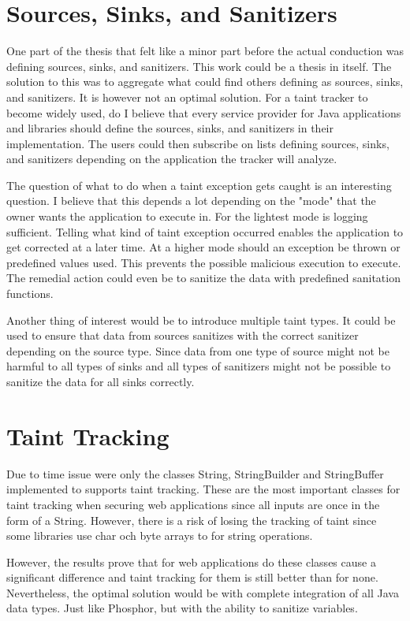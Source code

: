 \section{Sources, Sinks, and Sanitizers}
\label{sss}
One part of the thesis that felt like a minor part before the actual conduction was defining sources, sinks, and sanitizers. This work could be a thesis in itself. The solution to this was to aggregate what could find others defining as sources, sinks, and sanitizers. It is however not an optimal solution. For a taint tracker to become widely used, do I believe that every service provider for Java applications and libraries should define the sources, sinks, and sanitizers in their implementation. The users could then subscribe on lists defining sources, sinks, and sanitizers depending on the application the tracker will analyze.

The question of what to do when a taint exception gets caught is an interesting question. I believe that this depends a lot depending on the "mode" that the owner wants the application to execute in. For the lightest mode is logging sufficient. Telling what kind of taint exception occurred enables the application to get corrected at a later time. At a higher mode should an exception be thrown or predefined values used. This prevents the possible malicious execution to execute. The remedial action could even be to sanitize the data with predefined sanitation functions. 

Another thing of interest would be to introduce multiple taint types. It could be used to ensure that data from sources sanitizes with the correct sanitizer depending on the source type. Since data from one type of source might not be harmful to all types of sinks and all types of sanitizers might not be possible to sanitize the data for all sinks correctly.



\section{Taint Tracking}
\label{propagation}
Due to time issue were only the classes String, StringBuilder and StringBuffer implemented to supports taint tracking. These are the most important classes for taint tracking when securing web applications since all inputs are once in the form of a String. However, there is a risk of losing the tracking of taint since some libraries use char och byte arrays to for string operations.

However, the results prove that for web applications do these classes cause a significant difference and taint tracking for them is still better than for none. Nevertheless, the optimal solution would be with complete integration of all Java data types. Just like Phosphor, but with the ability to sanitize variables.



